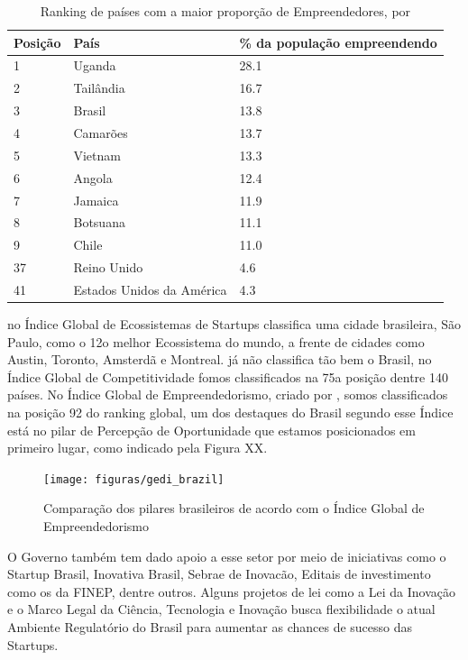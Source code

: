 \begin{table}[!htb]
	\centering
	\label{tabela:ranking_de_paises_com_mais_empreendedores}
	\begin{tabular}{ | p{3cm} | p{8cm} | p{4cm} | }
		\hline
		Posição & País & \% da população empreendendo \\ \hline
		1 & Uganda & 28.1 \\ \hline
		2 & Tailândia & 16.7 \\ \hline
		3 & Brasil & 13.8 \\ \hline
		4 & Camarões & 13.7 \\ \hline
		5 & Vietnam & 13.3 \\ \hline
		6 & Angola & 12.4 \\ \hline
		7 & Jamaica & 11.9 \\ \hline
		8 & Botsuana & 11.1 \\ \hline
		9 & Chile & 11.0 \\ \hline
		37 & Reino Unido & 4.6 \\ \hline
		41 & Estados Unidos da América & 4.3 \\ \hline
	\end{tabular}
	\caption{Ranking de países com a maior proporção de Empreendedores, por \cite{Brinded2015}}
\end{table}

 no Índice Global de Ecossistemas de Startups classifica uma cidade brasileira, São Paulo, como o 12o melhor Ecossistema do mundo, a frente de cidades como Austin, Toronto, Amsterdã e Montreal.  já não classifica tão bem o Brasil, no Índice Global de Competitividade fomos classificados na 75a posição dentre 140 países. No Índice Global de Empreendedorismo, criado por , somos classificados na posição 92 do ranking global, um dos destaques do Brasil segundo esse Índice está no pilar de Percepção de Oportunidade que estamos posicionados em primeiro lugar, como indicado pela Figura XX.

\begin{figure}[!htb]
	\centering
	\texttt{[image: figuras/gedi\_brazil]}
	\caption{Comparação dos pilares brasileiros de acordo com o Índice Global de Empreendedorismo}
	\label{figure:gedi_brazil}
\end{figure}

O Governo também tem dado apoio a esse setor por meio de iniciativas como o Startup Brasil, Inovativa Brasil, Sebrae de Inovacão, Editais de investimento como os da FINEP, dentre outros. Alguns projetos de lei como a Lei da Inovação e o Marco Legal da Ciência, Tecnologia e Inovação busca flexibilidade o atual Ambiente Regulatório do Brasil para aumentar as chances de sucesso das Startups. 

